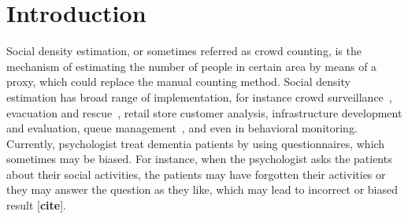 \chapter{Introduction}\label{ch:introduction}



Social density estimation, or sometimes referred as crowd counting, is the mechanism of estimating the number of people in certain area by means of a proxy, which could replace the manual counting method. Social density estimation has broad range of implementation, for instance crowd surveillance~\cite{thesis050}, evacuation and rescue~\cite{thesis045}, retail store customer analysis, infrastructure development and evaluation, queue management~\cite{thesis012}, and even in behavioral monitoring. Currently, psychologist treat dementia patients by using questionnaires, which sometimes may be biased. For instance, when the psychologist asks the patients about their social activities, the patients may have forgotten their activities or they may answer the question as they like, which may lead to incorrect or biased result [\textbf{cite}].

